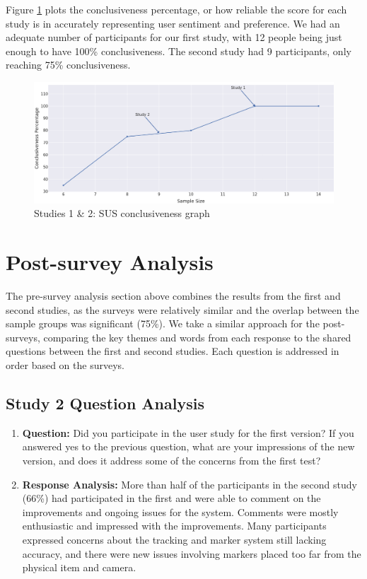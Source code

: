 \documentclass[thesis]{fputhesis}
\begin{document}
\begin{body}
\filbreak
Figure \ref{fig:conclusiveness} plots the conclusiveness percentage, or how reliable the score for each study is in accurately representing user sentiment and preference. We had an adequate number of participants for our first study, with 12 people being just enough to have 100\% conclusiveness. The second study had 9 participants, only reaching 75\% conclusiveness.

\begin{figure}[h!]
    \centering
    \includegraphics[width=\textwidth]{Images/conclusiveness_plot.png}
    \caption{Studies 1 \& 2: SUS conclusiveness graph}
    \label{fig:conclusiveness}
\end{figure}

\section{Post-survey Analysis}
The pre-survey analysis section above combines the results from the first and second studies, as the surveys were relatively similar and the overlap between the sample groups was significant (75\%). We take a similar approach for the post-surveys, comparing the key themes and words from each response to the shared questions between the first and second studies. Each question is addressed in order based on the surveys. 

\subsection{Study 2 Question Analysis}
\begin{enumerate}
    \item[] \textbf{Question: } Did you participate in the user study for the first version? If you answered yes to the previous question, what are your impressions of the new version, and does it address some of the concerns from the first test?
    \filbreak
    \item[] \textbf{Response Analysis: } More than half of the participants in the second study (66\%) had participated in the first and were able to comment on the improvements and ongoing issues for the system. Comments were mostly enthusiastic and impressed with the improvements. Many participants expressed concerns about the tracking and marker system still lacking accuracy, and there were new issues involving markers placed too far from the physical item and camera.
\end{enumerate}


\end{body}
\end{document}
